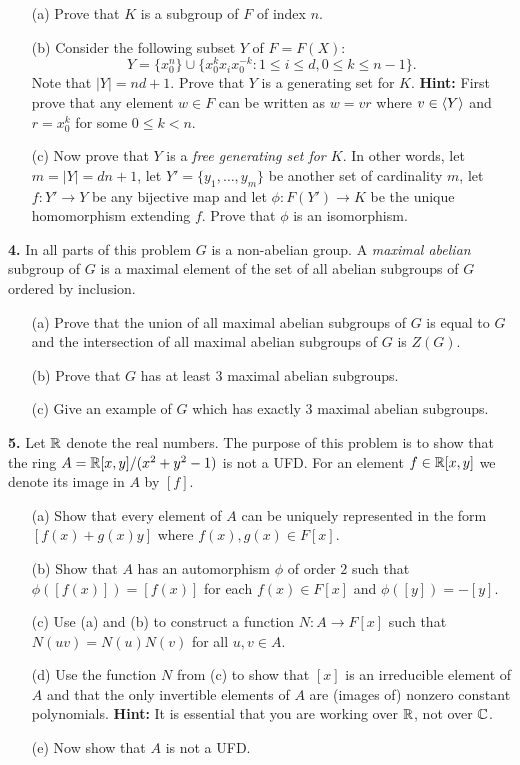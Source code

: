 \documentclass[12pt]{amsart}
\begin{document}
\begin{itemize}
\item[(a)] Prove that $K$ is a subgroup of $F$ of index $n$.

\item[(b)] Consider the following subset $Y$ of $F=F(X)$:  $$Y=\{x_0^n\}\cup\{x_0^k x_i x_0^{-k} : 1\leq i\leq d, 0\leq k\leq n-1\}.$$
Note that $|Y|=nd+1$. Prove that $Y$ is a generating set for $K$. {\bf Hint: } First prove that any element $w\in F$
can be written as $w=vr$ where $v\in {\langle} Y{\rangle}$ and $r=x_0^k$ for some $0\leq k<n$. 

\item[(c)] Now prove that $Y$ is a {\it free generating set for $K$}. In other words, let $m=|Y|=dn+1$, let $Y'=\{y_1,\ldots, y_m\}$
be another set of cardinality $m$, let $f:Y'\to Y$ be any bijective map and let $\phi:F(Y')\to K$ be the unique homomorphism extending $f$. Prove that $\phi$ is an isomorphism.
\end{itemize}


\skv
{\bf 4.} In all parts of this problem $G$ is a non-abelian group. A {\it maximal abelian} subgroup of $G$ is a maximal element of the set of all abelian subgroups of $G$ ordered by inclusion.
\begin{itemize}
\item[(a)] Prove that the union of all maximal abelian subgroups of $G$ is equal to $G$ and the intersection of all maximal abelian subgroups of $G$ is $Z(G)$.
\item[(b)] Prove that $G$ has at least 3 maximal abelian subgroups. 
\item[(c)] Give an example of $G$ which has exactly $3$ maximal abelian subgroups.
\end{itemize}
\skv
{\bf 5.} Let ${\mathbb R}$ denote the real numbers. The purpose of this problem is to show that the ring 
$A={\mathbb R}[x,y]/(x^2+y^2-1)$ is not a UFD. For an element $f\in {\mathbb R}[x,y]$ 
we denote its image in $A$ by $[f]$.

\begin{itemize}
\item[(a)] Show that every element of $A$ can be uniquely represented in the form $[f(x)+g(x)y]$
where $f(x),g(x)\in F[x]$. 
\item[(b)] Show that $A$ has an automorphism $\phi$ of order $2$ such that
$\phi([f(x)])=[f(x)]$ for each $f(x)\in F[x]$ and $\phi([y])= -[y]$.
\item[(c)] Use (a) and (b) to construct a function $N:A\to F[x]$ such that $N(uv)=N(u)N(v)$ for all $u,v\in A.$   
\item[(d)] Use the function $N$ from (c) to show that $[x]$ is an irreducible element of $A$
and that the only invertible elements of $A$ are (images of) nonzero constant polynomials.
{\bf Hint:} It is essential that you are working over ${\mathbb R}$, not over ${\mathbb C}$.
\item[(e)] Now show that $A$ is not a UFD.
\end{itemize}
\skv
\end{document}
